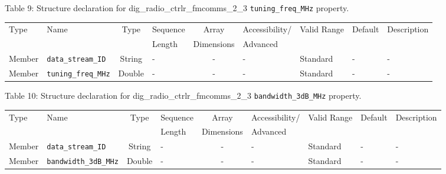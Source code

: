 \documentclass{article}
\def\comp{dig\_radio\_ctrlr\_fmcomms\_2\_3}
\begin{document}
\begin{landscape}
	\noindent Table \hypertarget{tab9}{9}: Structure declaration for \comp{} \verb+tuning_freq_MHz+ property.
	\begin{scriptsize}
		\noindent\begin{longtable}{|p{1.8cm}|p{3.6cm}|c|p{4cm}|c|p{2cm}|p{1.7cm}|p{0.8cm}|p{4.69cm}|}
			\hline
			\rowcolor{blue}
			Type         & Name                                & Type & Sequence & Array      & Accessibility/ & Valid Range  & Default & Description                                                                                                                                                                                                                       \\
			\rowcolor{blue}
			             &                                     &      & Length   & Dimensions & Advanced       &              &         &                                                                                                                                                                                                                             \\
			\hline
			Member       & \verb+data_stream_ID+               & String& -       & -          & -              & Standard     & -       & - \\
			\hline
			Member       & \verb+tuning_freq_MHz+              & Double & -       & -          & -              & Standard & -       & - \\
			\hline
		\end{longtable}
	\end{scriptsize}

	\noindent Table \hypertarget{tab10}{10}: Structure declaration for \comp{} \verb+bandwidth_3dB_MHz+ property.
	\begin{scriptsize}
		\noindent\begin{longtable}{|p{1.8cm}|p{3.6cm}|c|p{4cm}|c|p{2cm}|p{1.7cm}|p{0.8cm}|p{4.69cm}|}
			\hline
			\rowcolor{blue}
			Type         & Name                                & Type & Sequence & Array      & Accessibility/ & Valid Range  & Default & Description                                                                                                                                                                                                                       \\
			\rowcolor{blue}
			             &                                     &      & Length   & Dimensions & Advanced       &              &         &                                                                                                                                                                                                                             \\
			\hline
			Member       & \verb+data_stream_ID+               & String& -       & -          & -              & Standard     & -       & - \\
			\hline
			Member       & \verb+bandwidth_3dB_MHz+            & Double & -       & -          & -              & Standard & -       & - \\
			\hline
		\end{longtable}
	\end{scriptsize}


\end{landscape}
\end{document}
